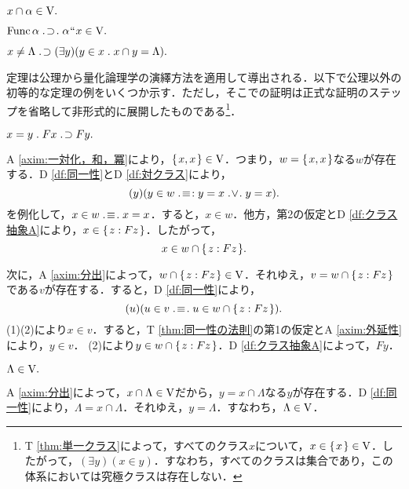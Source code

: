 \begin{axim}[分出]
\label{axim:分出}
$
    x\cap\alpha\in\mathrm{V}.
$
\end{axim}

\begin{axim}[置換]
\label{axim:置換}
$
    \func\alpha\case{1}{1}{1}\alpha\img x\in\univ.
$
\end{axim}

\begin{axim}[正則性]
\label{axim:正則性}
$
    x\neq \Lambda {\;.\!}\supset (\exists y)(y\in x{\;.\;}x\cap y=\Lambda).
$
\end{axim}

定理は公理から量化論理学の演繹方法を適用して導出される．以下で公理以外の初等的な定理の例をいくつか示す．ただし，そこでの証明は正式な証明のステップを省略して非形式的に展開したものである\footnote{
    T \ref{thm:単一クラス}によって，すべてのクラス$x$について，$x\in\{\mspace{2mu}x\mspace{2mu}\}\in\mathrm{V}$．したがって，$(\exists y)(x\in y)$．すなわち，すべてのクラスは集合であり，この体系においては究極クラスは存在しない．
}．

\begin{thm}[同一性の法則]
\label{thm:同一性の法則}
$
    x=y\con{1}Fx\case{1}{1}{0}Fy.
$
\end{thm}
\setcounter{equation}{0}
\begin{pf}

A \ref{axim:一対化，和，冪}により，$\{\mspace{2mu}x,x\mspace{2mu}\}\in\mathrm{V}$．つまり，$w = \{\mspace{2mu}x,x\mspace{2mu}\}$なる$w$が存在する．D \ref{df:同一性}とD \ref{df:対クラス}により，
\[
    (y)(y\in w\case{3}{1}{2}y=x\case{2}{1}{1}y=x).
\]
を例化して，$x\in w\case{3}{1}{1}x = x$．すると，$x\in w$．他方，第2の仮定とD \ref{df:クラス抽象A}により，$ x\in\{\mspace{2mu}z:Fz\mspace{2mu}\} $．したがって，
\begin{equation}
    x\in w\cap\{\mspace{2mu}z:Fz\mspace{2mu}\}.
\end{equation}

次に，A \ref{axim:分出}によって，$w\cap \{\mspace{2mu}z:Fz\mspace{2mu}\}\in\mathrm{V}$．それゆえ，$v=w\cap \{\mspace{2mu}z:Fz\mspace{2mu}\}$である$v$が存在する．すると，D \ref{df:同一性}により，
\begin{equation}
    (u)(u\in v\case{3}{1}{1}u\in w\cap\classab{z:Fz}).
\end{equation}
(1)(2)により$x\in v$．すると，T \ref{thm:同一性の法則}の第1の仮定とA \ref{axim:外延性}により，$y\in v$．
(2)により$y\in w\cap\{\mspace{2mu}z:Fz\mspace{2mu}\}$．D \ref{df:クラス抽象A}によって，$Fy$．
\end{pf}

\begin{thm}[空集合]
\label{thm:空集合}
$
    \Lambda\in\mathrm{V}.
$
\end{thm}
\begin{pf}
    A \ref{axim:分出}によって，$x\cap\Lambda\in\mathrm{V}$だから，$ y = x\cap\Lambda $なる$y$が存在する．D \ref{df:同一性}により，$ \Lambda = x\cap\Lambda $．それゆえ，$ y = \Lambda $．すなわち，$ \Lambda\in\mathrm{V} $．
\end{pf}

